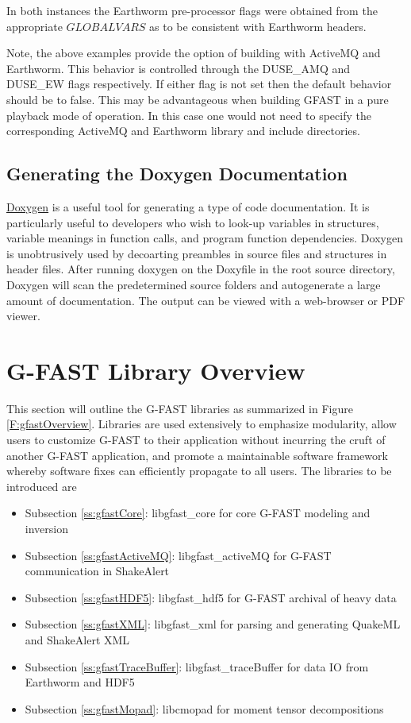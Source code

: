\documentclass[12pt]{article}
\begin{document}
In both instances the Earthworm pre-processor flags were obtained from the appropriate
${GLOBALVARS}$ as to be consistent with Earthworm headers. 

Note, the above examples provide the option of building with ActiveMQ and Earthworm.  This
behavior is controlled through the DUSE\_AMQ and DUSE\_EW flags respectively.  If either flag
is not set then the default behavior should be to false.  This may be advantageous when
building GFAST in a pure playback mode of operation.  In this case one would not need to 
specify the corresponding ActiveMQ and Earthworm library and include directories.  

\subsection{Generating the Doxygen Documentation}
\href{http://www.stack.nl/~dimitri/doxygen/}{Doxygen}
is a useful tool for generating a type of code documentation.  It is particularly
useful to developers who wish to look-up variables in structures, variable meanings in 
function calls, and program function dependencies.  Doxygen is unobtrusively used by
decoarting preambles in source files and structures in header files.  After running
doxygen on the Doxyfile in the root source directory, Doxygen will scan the predetermined
source folders and autogenerate a large amount of documentation.  The output can be viewed
with a web-browser or PDF viewer.  

\clearpage
\section{G-FAST Library Overview}
This section will outline the G-FAST libraries as summarized in Figure \ref{F:gfastOverview}.  
Libraries are used extensively 
to emphasize modularity, allow users to customize G-FAST to their application 
without incurring the cruft of another G-FAST application, and promote a maintainable
software framework whereby software fixes can efficiently propagate to all users.  
The libraries to be introduced are
\begin{itemize} 
 \item Subsection \ref{ss:gfastCore}: libgfast\_core for core G-FAST modeling and inversion  
 \item Subsection \ref{ss:gfastActiveMQ}: libgfast\_activeMQ for G-FAST communication in ShakeAlert
 \item Subsection \ref{ss:gfastHDF5}: libgfast\_hdf5 for G-FAST archival of heavy data
 \item Subsection \ref{ss:gfastXML}: libgfast\_xml for parsing and generating QuakeML and ShakeAlert XML
 \item Subsection \ref{ss:gfastTraceBuffer}: libgfast\_traceBuffer for data IO from Earthworm and HDF5
 \item Subsection \ref{ss:gfastMopad}: libcmopad for moment tensor decompositions 
\end{itemize}
\end{document}
